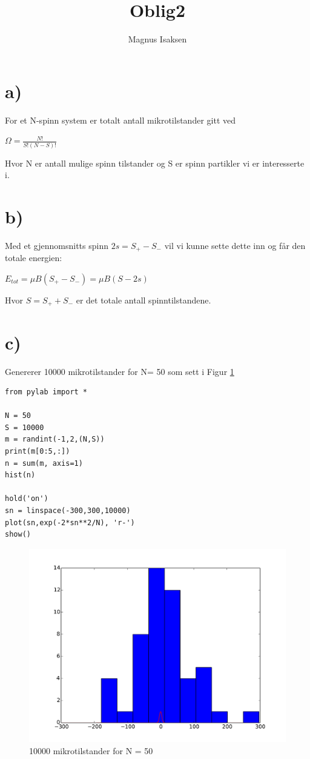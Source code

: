 \documentclass[norsk,12pt]{article}
\begin{document}
\title{Oblig2}
\author{Magnus Isaksen}
\maketitle

\section*{a)}

For et N-spinn system er totalt antall mikrotilstander gitt ved

$\Omega = \frac{N!}{S!(N-S)!}$

Hvor N er antall mulige spinn tilstander og S er spinn partikler vi er interesserte i. 

\section*{b)}

Med et gjennomsnitts spinn $2s =S_+ - S_-$ vil vi kunne sette dette inn og får den totale energien: 

$E_{tot} = \mu B (S_+ - S_-) = \mu B (S-2s) $

Hvor $S = S_+ + S_-$ er det totale antall spinntilstandene. 

\section*{c)}

Genererer 10000 mikrotilstander for N= 50 som sett i Figur \ref{mikro}

\begin{lstlisting}
from pylab import *

N = 50  
S = 10000
m = randint(-1,2,(N,S))
print(m[0:5,:])
n = sum(m, axis=1)
hist(n)

hold('on')
sn = linspace(-300,300,10000)
plot(sn,exp(-2*sn**2/N), 'r-')
show()
\end{lstlisting}

\begin{figure}[hb!]
\includegraphics[width = \textwidth]{figure_1.pdf}
\caption{10000 mikrotilstander for N = 50}
\label{mikro}
\end{figure}
\end{document}

